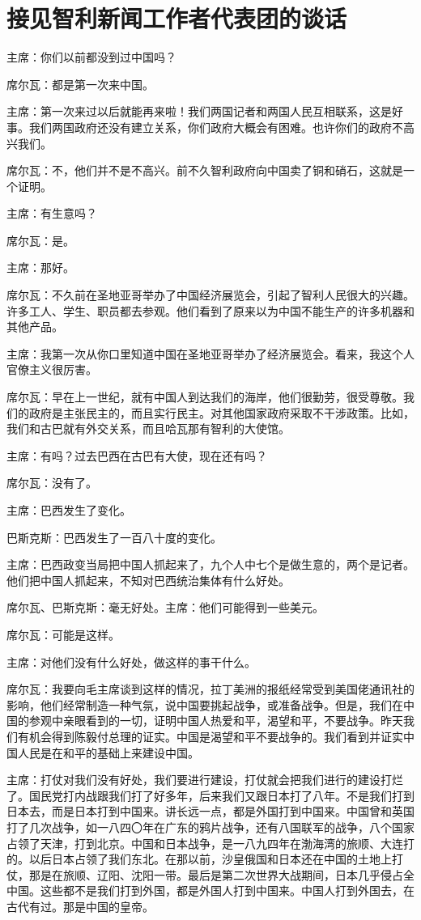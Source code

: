 \section[接见智利新闻工作者代表团的谈话（一九六四年六月二十三日）]{接见智利新闻工作者代表团的谈话}


主席：你们以前都没到过中国吗？

席尔瓦：都是第一次来中国。

主席：第一次来过以后就能再来啦！我们两国记者和两国人民互相联系，这是好事。我们两国政府还没有建立关系，你们政府大概会有困难。也许你们的政府不高兴我们。

席尔瓦：不，他们并不是不高兴。前不久智利政府向中国卖了铜和硝石，这就是一个证明。

主席：有生意吗？

席尔瓦：是。

主席：那好。

席尔瓦：不久前在圣地亚哥举办了中国经济展览会，引起了智利人民很大的兴趣。许多工人、学生、职员都去参观。他们看到了原来以为中国不能生产的许多机器和其他产品。

主席：我第一次从你口里知道中国在圣地亚哥举办了经济展览会。看来，我这个人官僚主义很厉害。

席尔瓦：早在上一世纪，就有中国人到达我们的海岸，他们很勤劳，很受尊敬。我们的政府是主张民主的，而且实行民主。对其他国家政府采取不干涉政策。比如，我们和古巴就有外交关系，而且哈瓦那有智利的大使馆。

主席：有吗？过去巴西在古巴有大使，现在还有吗？

席尔瓦：没有了。

主席：巴西发生了变化。

巴斯克斯：巴西发生了一百八十度的变化。

主席：巴西政变当局把中国人抓起来了，九个人中七个是做生意的，两个是记者。他们把中国人抓起来，不知对巴西统治集体有什么好处。

席尔瓦、巴斯克斯：毫无好处。主席：他们可能得到一些美元。

席尔瓦：可能是这样。

主席：对他们没有什么好处，做这样的事干什么。

席尔瓦：我要向毛主席谈到这样的情况，拉丁美洲的报纸经常受到美国佬通讯社的影响，他们经常制造一种气氛，说中国要挑起战争，或准备战争。但是，我们在中国的参观中亲眼看到的一切，证明中国人热爱和平，渴望和平，不要战争。昨天我们有机会得到陈毅付总理的证实。中国是渴望和平不要战争的。我们看到并证实中国人民是在和平的基础上来建设中国。

主席：打仗对我们没有好处，我们要进行建设，打仗就会把我们进行的建设打烂了。国民党打内战跟我们打了好多年，后来我们又跟日本打了八年。不是我们打到日本去，而是日本打到中国来。讲长远一点，都是外国打到中国来。中国曾和英国打了几次战争，如一八四〇年在广东的鸦片战争，还有八国联军的战争，八个国家占领了天津，打到北京。中国和日本战争，是一八九四年在渤海湾的旅顺、大连打的。以后日本占领了我们东北。在那以前，沙皇俄国和日本还在中国的土地上打仗，那是在旅顺、辽阳、沈阳一带。最后是第二次世界大战期间，日本几乎侵占全中国。这些都不是我们打到外国，都是外国人打到中国来。中国人打到外国去，在古代有过。那是中国的皇帝。


